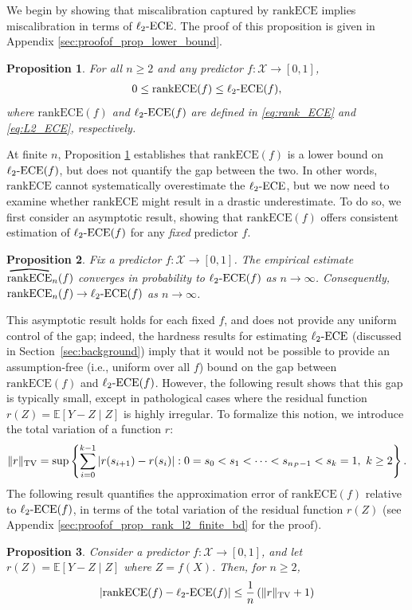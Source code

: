 \documentclass[11pt]{article}
\numberwithin{equation}{section}
\newtheorem{proposition}{Proposition}[section]
\theoremstyle{definition}
\newcommand{\E}{\mathbb{E}}
\newcommand{\cX}{\mathcal{X}}
\newcommand{\ra}{\rightarrow}
\newcommand{\myoverline}[2][3.5em]{%
  \overset{%
    \tikz[baseline=-0.1ex]{
      \draw[line width=0.75pt]
        (0,0) .. controls (#1/2,0.5ex) .. (#1,0);
    }%
  }{#2}%
}
\newcommand{\ECE}{\mathrm{ECE}}
\newcommand{\lECE}{\ell_2\textnormal{-}\ECE}
\newcommand{\rankECE}{\mathrm{rankECE}}
\newcommand{\hatrankECE}{\myoverline{\rankECE}}
\begin{document}
We begin by showing that miscalibration captured by $\rankECE$ implies miscalibration in terms of $\lECE$. The proof of this proposition is given in Appendix \ref{sec:proofof_prop_lower_bound}. 
\begin{proposition}\label{prop:lower_bound}
For all $n\ge 2$ and any predictor $f:\cX\ra[0,1]$,
\begin{align*}
    0 \leq \rankECE(f) \leq \lECE(f),
\end{align*}
where $\rankECE(f)$ and $\lECE(f)$ are defined in \eqref{eq:rank_ECE} and \eqref{eq:L2_ECE}, respectively.
\end{proposition}
\noindent At finite $n$, Proposition \ref{prop:lower_bound} establishes that $\rankECE(f)$ is a lower bound on $\lECE(f)$, but does not quantify the gap between the two. In other words, $\rankECE$ cannot systematically overestimate the $\lECE$, but we now need to examine whether $\rankECE$ might result in a drastic underestimate. To do so, we first consider an asymptotic result, showing that $\rankECE(f)$ offers consistent estimation of $\lECE(f)$ for any \emph{fixed} predictor $f$. 

\begin{proposition}\label{prop:consistency}
Fix a predictor $f:\cX\ra[0,1]$. The empirical estimate $\hatrankECE_n(f)$ converges in probability to $\lECE(f)$ as $n\ra\infty$. Consequently, $\rankECE_n(f)\to\lECE(f)$ as $n\to\infty$.
\end{proposition}
\noindent This asymptotic result holds for each fixed $f$, and does not provide any uniform control of the gap; indeed, the hardness results for estimating $\lECE$ (discussed in Section~\ref{sec:background}) imply that it would not be possible to provide an assumption-free (i.e., uniform over all $f$) bound on the gap between $\rankECE(f)$ and $\lECE(f)$. However,
the following result shows that this gap is typically small, except in pathological cases where the residual function $r(Z)=\E[Y-Z\mid Z]$ is highly irregular. To formalize this notion, we introduce the total variation of a function $r$:
\begin{align}\label{eq:def_TV}
    \|r\|_{\textnormal{TV}} = \sup\left\{\sum_{i=0}^{k-1}\left|r(s_{i+1}) - r(s_i)\right|:0 = s_0<s_1<\cdots<s_{n_P-1}<s_k = 1,~ k\geq 2\right\}.
\end{align}
The following result quantifies the approximation error of $\rankECE(f)$ relative to $\lECE(f)$, in terms of the total variation of the residual function $r(Z)$ (see Appendix \ref{sec:proofof_prop_rank_l2_finite_bd} for the proof).
\begin{proposition}\label{prop:rank_l2_finite_bd}
    Consider a predictor $f:\cX\ra[0,1]$, and let $r(Z) = \E[Y-Z\mid Z]$ where $Z=f(X)$. Then, for $n\geq 2$,
    \begin{align*}
        \left|\rankECE(f) - \lECE(f)\right|\leq \frac{1}{n}\left(\|r\|_{\textnormal{TV}} + 1\right)
    \end{align*}
\end{proposition}
\end{document}
